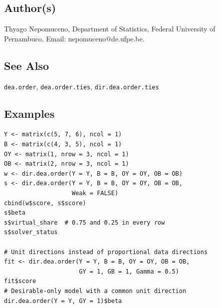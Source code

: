 \documentclass[10pt,a4paper]{article}
\newcommand{\field}[1]{\needspace{3\baselineskip}\subsection*{#1}}
\begin{document}
\field{Author(s)}
Thyago Nepomuceno, Department of Statistics, Federal University of Pernambuco. Email: nepomuceno@de.ufpe.be.
\field{See Also}
\texttt{dea.order}, \texttt{dea.order.ties}, \texttt{dir.dea.order.ties}
\field{Examples}
\begin{verbatim}
Y <- matrix(c(5, 7, 6), ncol = 1)
B <- matrix(c(4, 3, 5), ncol = 1)
OY <- matrix(1, nrow = 3, ncol = 1)
OB <- matrix(2, nrow = 3, ncol = 1)
w <- dir.dea.order(Y = Y, B = B, OY = OY, OB = OB)
s <- dir.dea.order(Y = Y, B = B, OY = OY, OB = OB,
                   Weak = FALSE)
cbind(w$score, s$score)
s$beta
s$virtual_share  # 0.75 and 0.25 in every row
s$solver_status

# Unit directions instead of proportional data directions
fit <- dir.dea.order(Y = Y, B = B, OY = OY, OB = OB,
                     GY = 1, GB = 1, Gamma = 0.5)
fit$score
# Desirable-only model with a common unit direction
dir.dea.order(Y = Y, GY = 1)$beta
\end{verbatim}
\end{document}
